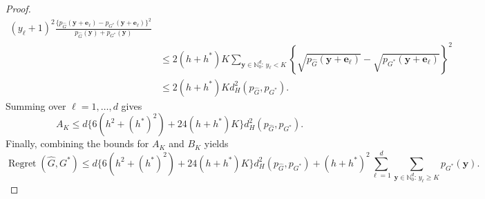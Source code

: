 \documentclass[10pt,a4paper]{amsart}
\begin{document}
\begin{proof}
\begin{align*}
(y_\ell+1)^2
\frac{
\{p_{\widehat G}(\boldsymbol y+\boldsymbol e_\ell)
-
p_{G^\ast}(\boldsymbol y+\boldsymbol e_\ell)\}^2
}{
p_{\widehat G}(\boldsymbol y)+p_{G^\ast}(\boldsymbol y)
}
\\
&\leq
2(h+h^\ast)K
\sum_{\boldsymbol y\in\mathbb N_0^d:\,y_\ell<K}
\left\{
\sqrt{p_{\widehat G}(\boldsymbol y+\boldsymbol e_\ell)}
-
\sqrt{p_{G^\ast}(\boldsymbol y+\boldsymbol e_\ell)}
\right\}^2\\
&\leq 2(h+h^\ast)K
d_H^2(p_{\widehat G},p_{G^\ast}).
\end{align*}
Summing over $\ell=1,\ldots,d$ gives
\[
A_K
\leq
d\Big\{
6(h^2+(h^\ast)^2)
+
24(h+h^\ast)K
\Big\}
d_H^2(p_{\widehat G},p_{G^\ast}).
\]
Finally, combining the bounds for $A_K$ and $B_K$ yields
\[
\operatorname{Regret}(\widehat G,G^\ast)
\leq
d\Big\{
6(h^2+(h^\ast)^2)+24(h+h^\ast)K
\Big\}
d_H^2(p_{\widehat G},p_{G^\ast})
+
(h+h^\ast)^2
\sum_{\ell=1}^d
\sum_{\boldsymbol y\in\mathbb N_0^d:\,y_\ell\geq K}
p_{G^\ast}(\boldsymbol y).
\]
\end{proof}
\end{document}

